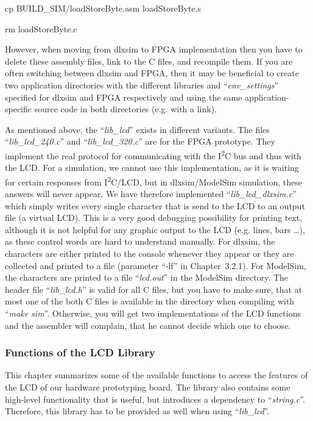 \documentclass[
]{article}
\begin{document}
cp BUILD\_SIM/loadStoreByte.asm loadStoreByte.s

rm loadStoreByte.c

However, when moving from dlxsim to FPGA implementation then you have to
delete these assembly files, link to the C files, and recompile them. If
you are often switching between dlxsim and FPGA, then it may be
beneficial to create two application directories with the different
libraries and ``\emph{env\_settings}'' specified for dlxsim and FPGA
respectively and using the same application-specific source code in both
directories (e.g. with a link).

As mentioned above, the ``\emph{lib\_lcd}'' exists in different
variants. The files ``\emph{lib\_lcd\_240.c}'' and
``\emph{lib\_lcd\_320.c}'' are for the FPGA prototype. They implement
the real protocol for communicating with the I\textsuperscript{2}C bus
and thus with the LCD. For a simulation, we cannot use this
implementation, as it is waiting for certain responses from
I\textsuperscript{2}C/LCD, but in dlxsim/ModelSim simulation, these
answers will never appear. We have therefore implemented
``\emph{lib\_lcd\_­dlxsim.c}'' which simply writes every single
character that is send to the LCD to an output file (a virtual LCD).
This is a very good debugging possibility for printing text, although it
is not helpful for any graphic output to the LCD (e.g. lines, bars
\ldots), as these control words are hard to understand manually. For
dlxsim, the characters are either printed to the console whenever they
appear or they are collected and printed to a file (parameter ``-lf'' in
Chapter~3.2.1). For ModelSim, the characters are printed to a file
``\emph{lcd.out}'' in the ModelSim directory. The header file
``\emph{lib\_lcd.h}'' is valid for all C files, but you have to make
sure, that at most one of the both C files is available in the directory
when compiling with ``\emph{make sim}''. Otherwise, you will get two
implementations of the LCD functions and the assembler will complain,
that he cannot decide which one to choose.

\hypertarget{functions-of-the-lcd-library}{%
\subsubsection{Functions of the LCD
Library}\label{functions-of-the-lcd-library}}

This chapter summarizes some of the available functions to access the
features of the LCD of our hardware prototyping board. The library also
contains some high-level functionality that is useful, but introduces a
dependency to ``\emph{string.c}''. Therefore, this library has to be
provided as well when using ``\emph{lib\_lcd}''.
\end{document}
